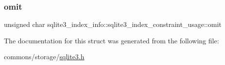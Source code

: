 \subsubsection{\texorpdfstring{omit}{omit}}
{\footnotesize\ttfamily unsigned char sqlite3\+\_\+index\+\_\+info\+::sqlite3\+\_\+index\+\_\+constraint\+\_\+usage\+::omit}



The documentation for this struct was generated from the following file\+:\begin{DoxyCompactItemize}
\item 
commons/storage/\mbox{\hyperlink{sqlite3_8h}{sqlite3.\+h}}\end{DoxyCompactItemize}
